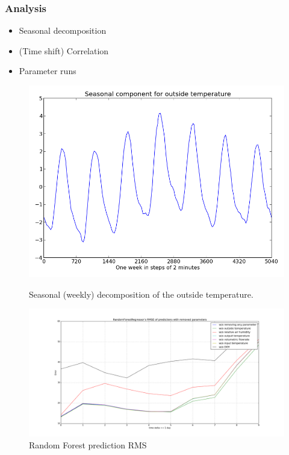 \documentclass{beamer}
\begin{document}
\begin{frame}
\frametitle{Analysis}

\begin{itemize}
\item Seasonal decomposition
\item (Time shift) Correlation 
\item Parameter runs
\end{itemize}



\begin{figure}[H]
\centering
\begin{minipage}{.5\textwidth}
  \centering
  \includegraphics[height=0.6\linewidth]{img/season-outside_temperature.png}
  \caption{Seasonal (weekly) decomposition of the outside temperature.}
\end{minipage}%
\begin{minipage}{.5\textwidth}
  \centering
  \includegraphics[height=0.6\linewidth]{img/RandomForestRegressor_day_error_without_some_params_max_depth.png}
  \caption{Random Forest prediction RMS}
\end{minipage}
\end{figure}


\end{frame}
\end{document}

